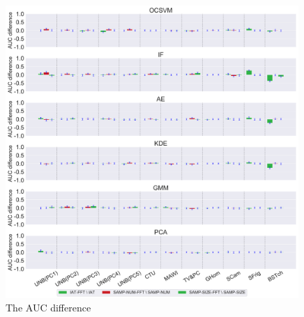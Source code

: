 \documentclass{article}
\begin{document}
\begin{figure}[H]
\centering
\includegraphics[width=0.99\textwidth, trim=0cm 0cm 0cm 0cm,clip]{OCSVM_IF_AE_KDE_GMM_PCA_with_best_parameters_on_basic_representations_diff.pdf}
\caption{The AUC difference}
\label{OCSVM_IF_AE_KDE_GMM_PCA_with_best_parameters_on_basic_representations_diff}
\end{figure}

\end{document}
